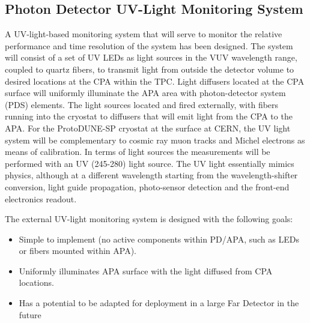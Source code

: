 
\subsection{Photon Detector UV-Light Monitoring System}
\label{sec_pd_calib}


A UV-light-based monitoring system that will serve to monitor the relative performance and time resolution of the system has been designed. %
The system will consist of a set of UV LEDs as light sources in the VUV wavelength range, coupled to quartz fibers, to transmit light from outside the detector volume to desired locations at the CPA within the TPC.
Light diffusers located at the CPA surface will uniformly illuminate the APA area with photon-detector system (PDS) elements.
The light sources located and fired externally, with fibers running into the cryostat to diffusers that will emit light from the CPA to the APA. 
For the ProtoDUNE-SP cryostat at the surface at CERN, the UV light system will be complementary to cosmic ray muon 
tracks and Michel electrons as means of calibration. In terms of light sources the measurements will be performed with an UV (245-280) light source.
The UV light essentially mimics physics, although at a different wavelength starting from the wavelength-shifter conversion, 
light guide propagation, photo-sensor detection and the front-end electronics readout.
	
The external UV-light monitoring system is designed with the following goals:
				
\begin{itemize}
\item Simple to implement (no active components within PD/APA, such as LEDs or fibers mounted within APA).
\item Uniformly illuminates APA surface with the light diffused from CPA locations.
\item Has a potential to be adapted for deployment in a large Far Detector in the future
\end{itemize}


